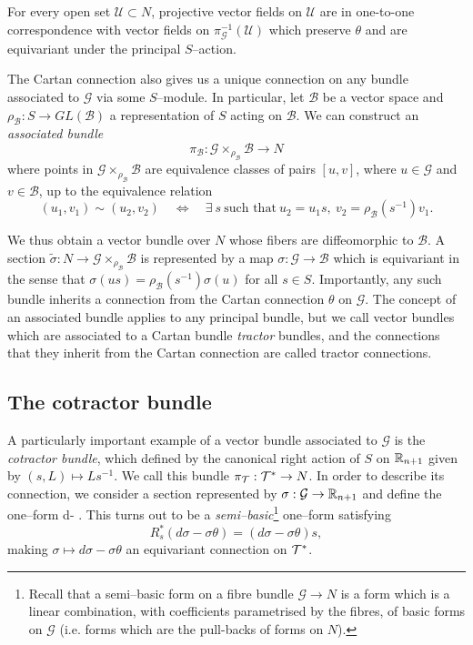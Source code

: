 \begin{rmk} \label{rmk:theta_symmetry}
For every open set $\mathcal{U}\subset N$, projective vector fields on $\mathcal{U}$ are in one-to-one correspondence with vector fields on $\pi_\mathcal{G}^{-1}(\mathcal{U})$
which preserve $\theta$ and are equivariant under the principal $S$--action.
\end{rmk}


\begin{rmk}
The Cartan connection also gives us a unique connection on any bundle associated to $\mathcal{G}$ via some $S$--module. In particular, let $\mathcal{B}$ be a vector space and $\rho_\mathcal{B}:S\rightarrow GL(\mathcal{B})$ a representation of $S$ acting on $\mathcal{B}$. We can construct an \textit{associated bundle}
\[\pi_\mathcal{B}:\mathcal{G}\times_{\rho_\mathcal{B}} \mathcal{B}\rightarrow N \]
where points in $\mathcal{G}\times_{\rho_\mathcal{B}} \mathcal{B}$ are equivalence classes of pairs $[u,v]$, where $u\in \mathcal{G}$ and $v\in \mathcal{B}$, up to the equivalence relation
\[
(u_1,v_1)\sim (u_2,v_2) \quad \Leftrightarrow \quad \exists\ s\ \mbox{such that}\  u_2=u_1 s,\  v_2 = \rho_\mathcal{B}(s^{-1}) v_1.
\]

We thus obtain a vector bundle over $N$ whose fibers are diffeomorphic to $\mathcal{B}$. A section $\tilde{\sigma}:N\rightarrow \mathcal{G}\times_{\rho_\mathcal{B}} \mathcal{B}$ is represented by a map ${\sigma}:\mathcal{G}\rightarrow \mathcal{B}$ which is equivariant in the sense that ${\sigma}(us)=\rho_\mathcal{B}(s^{-1}){\sigma}(u)$ for all $s\in S$. Importantly, any such bundle inherits a connection from the Cartan connection $\theta$ on $\mathcal{G}$. The concept of an associated bundle applies to any principal bundle, but we call vector bundles which are associated to a Cartan bundle \textit{tractor} bundles, and the connections that they inherit from the Cartan connection are called tractor connections.
\end{rmk}


\subsection{The cotractor bundle}
A particularly important example of a vector bundle associated to $\mathcal{G}$ is the \textit{cotractor bundle}, which defined by the canonical right action of $S$ on $\mathbb{R}_{n+1}$ given by $(s,L)\mapsto Ls^{-1}$. We call this bundle $\pi_\mathcal{T}:\mathcal{T}^*\rightarrow N$. In order to describe its connection, we consider a section represented by $\sigma:\mathcal{G}\rightarrow\mathbb{R}_{n+1}$ and define the one--form
\be \label{eq:df-ftheta}
d\sigma - \sigma\theta.
\ee
This turns out to be a \textit{semi--basic}\footnote{Recall that a semi--basic form on a fibre bundle $\mathcal{G}\rightarrow N$ is a form which is a linear combination, with coefficients parametrised by the fibres, of basic forms on $\mathcal{G}$ (i.e. forms which are the pull-backs of forms on $N$).} one--form satisfying
\[
R_s^*(d\sigma-\sigma\theta) = (d\sigma - \sigma\theta)s,
\]
making $\sigma\mapsto d\sigma-\sigma\theta$ an equivariant connection on $\mathcal{T}^*$.

